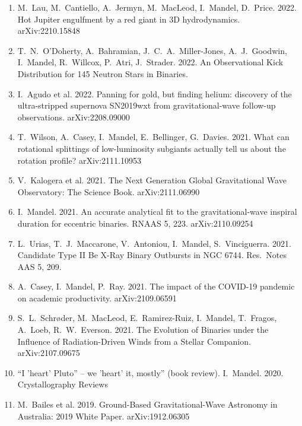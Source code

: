 \documentclass[margin,line]{res}
\begin{document}
\begin{resume}
\begin{enumerate}
\item M.~Lau, M.~Cantiello, A.~Jermyn, M.~MacLeod, I.~Mandel, D.~Price.  2022.  Hot Jupiter engulfment by a red giant in 3D hydrodynamics.  arXiv:2210.15848

\item T.~N.~O'Doherty, A.~Bahramian, J.~C.~A.~Miller-Jones, A.~J.~Goodwin, I.~Mandel, R.~Willcox, P.~Atri, J.~Strader.  2022.  An Observational Kick Distribution for 145 Neutron Stars in Binaries.  

\item I.~Agudo et al. 2022.  Panning for gold, but finding helium: discovery of the ultra-stripped supernova SN2019wxt from gravitational-wave follow-up observations.  arXiv:2208.09000

\item T.~Wilson, A.~Casey, I.~Mandel, E.~Bellinger, G.~Davies.  2021.  What can rotational splittings of low-luminosity subgiants actually tell us about the rotation profile?  arXiv:2111.10953

\item V.~Kalogera et al.  2021. The Next Generation Global Gravitational Wave Observatory: The Science Book.  arXiv:2111.06990

\item I.~Mandel.  2021.  An accurate analytical fit to the gravitational-wave inspiral duration for eccentric binaries. RNAAS 5, 223. arXiv:2110.09254

\item L.~Urias, T.~J.~Maccarone, V.~Antoniou, I.~Mandel, S.~Vinciguerra.  2021.  Candidate Type II Be X-Ray Binary Outbursts in NGC 6744.  Res.~Notes AAS 5, 209.

\item A.~Casey, I.~Mandel, P.~Ray. 2021. The impact of the COVID-19 pandemic on academic productivity.  arXiv:2109.06591

\item S.~L.~Schr{\o}der, M.~MacLeod, E.~Ramirez-Ruiz, I.~Mandel, T.~Fragos, A.~Loeb, R.~W.~Everson. 2021. The Evolution of Binaries under the Influence of Radiation-Driven Winds
  from a Stellar Companion.  arXiv:2107.09675

\item ``I 'heart' Pluto'' -- we 'heart' it, mostly'' (book review).  I.~Mandel.  2020.  Crystallography Reviews

\item M.~Bailes et al. 2019. Ground-Based Gravitational-Wave Astronomy in Australia: 2019 White Paper. arXiv:1912.06305


\end{enumerate}
\end{resume}
\end{document}
